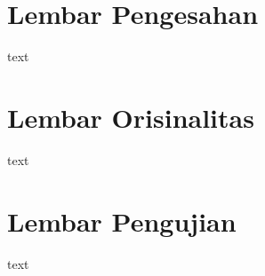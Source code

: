 \chapter{Lembar Pengesahan}
text

\chapter{Lembar Orisinalitas}
text

\chapter{Lembar Pengujian}
text